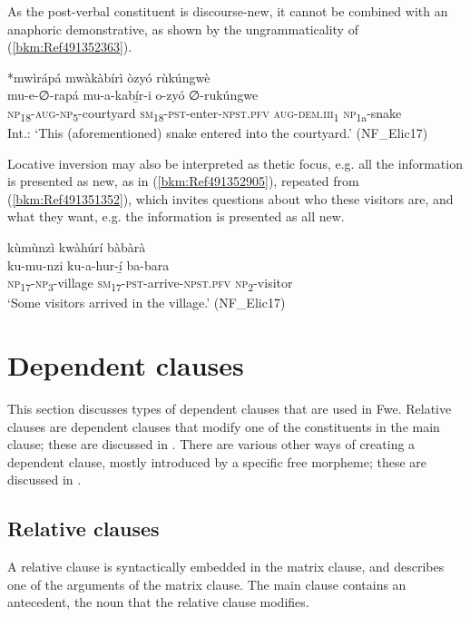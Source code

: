 As the post-verbal constituent is discourse-new, it cannot be combined with an anaphoric demonstrative, as shown by the ungrammaticality of (\ref{bkm:Ref491352363}).

\ea
\label{bkm:Ref491352363}
*mwìrápá mwàkàbírì òzyó rùkúngwè\\
  \gll mu-e-∅-rapá mu-a-kabí̲r-i o-zyó  ∅-rukúngwe\\
  \textsc{np}\textsubscript{18}-\textsc{aug}-\textsc{np}\textsubscript{5}-courtyard \textsc{sm}\textsubscript{18}-\textsc{pst}-enter-\textsc{npst}.\textsc{pfv} \textsc{aug}-\textsc{dem}.\textsc{iii}\textsubscript{1} \textsc{np}\textsubscript{1a}-snake\\
\glt Int.: ‘This (aforementioned) snake entered into the courtyard.’ (NF\_Elic17)
\z

Locative inversion may also be interpreted as thetic focus, e.g. all the information is presented as new, as in (\ref{bkm:Ref491352905}), repeated from (\ref{bkm:Ref491351352}), which invites questions about who these visitors are, and what they want, e.g. the information is presented as all new.

\ea
\label{bkm:Ref491352905}
kùmùnzì kwàhúrí bàbàrà\\
\gll ku-mu-nzi    ku-a-hur-í̲      ba-bara\\
\textsc{np}\textsubscript{17}-\textsc{np}\textsubscript{3}-village  \textsc{sm}\textsubscript{17}-\textsc{pst}-arrive-\textsc{npst}.\textsc{pfv}  \textsc{np}\textsubscript{2}-visitor\\
\glt ‘Some visitors arrived in the village.’ (NF\_Elic17)
\z
\section{Dependent clauses}
\hypertarget{Toc75352716}{}\label{bkm:Ref75346027}
This section discusses types of dependent clauses that are used in Fwe. Relative clauses are dependent clauses that modify one of the constituents in the main clause; these are discussed in . There are various other ways of creating a dependent clause, mostly introduced by a specific free morpheme; these are discussed in .

\subsection{Relative clauses}
\label{bkm:Ref490828195}\hypertarget{Toc75352717}{}\label{bkm:Ref491095705}
A relative clause is syntactically embedded in the matrix clause, and describes one of the arguments of the matrix clause. The main clause contains an antecedent, the noun that the relative clause modifies.


